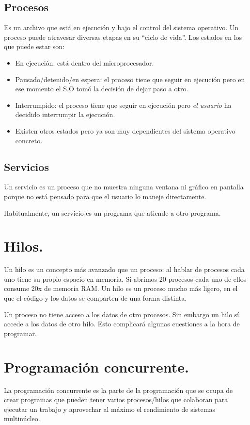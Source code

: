 \documentclass[a4paper,12pt,spanish]{sphinxmanual}
\begin{document}
\subsection{Procesos}
\label{textos/tema1:procesos}
Es un archivo que está en ejecución y bajo el control del sistema operativo. Un proceso puede atravesar diversas etapas en su ``ciclo de vida''. Los estados en los que puede estar son:
\begin{itemize}
\item {} 
En ejecución: está dentro del microprocesador.

\item {} 
Pausado/detenido/en espera: el proceso tiene que seguir en ejecución pero en ese momento el S.O tomó la decisión de dejar paso a otro.

\item {} 
Interrumpido: el proceso tiene que seguir en ejecución pero \emph{el usuario} ha decidido interrumpir la ejecución.

\item {} 
Existen otros estados pero ya son muy dependientes del sistema operativo concreto.

\end{itemize}


\subsection{Servicios}
\label{textos/tema1:servicios}
Un servicio es un proceso que no muestra ninguna ventana ni gráfico en pantalla porque no está pensado para que el usuario lo maneje directamente.

Habitualmente, un servicio es un programa que atiende a otro programa.


\section{Hilos.}
\label{textos/tema1:hilos}
Un hilo es un concepto más avanzado que un proceso: al hablar de procesos cada uno tiene su propio espacio en memoria. Si abrimos 20 procesos cada uno de ellos consume 20x de memoria RAM. Un hilo es un proceso mucho más ligero, en el que el código y los datos se comparten de una forma distinta.

Un proceso no tiene acceso a los datos de otro procesos. Sin embargo un hilo sí accede a los datos de otro hilo. Esto complicará algunas cuestiones a la hora de programar.


\section{Programación concurrente.}
\label{textos/tema1:programacion-concurrente}
La programación concurrente es la parte de la programación que se ocupa de crear programas que pueden tener varios procesos/hilos que colaboran para ejecutar un trabajo y aprovechar al máximo el rendimiento de sistemas multinúcleo.
\end{document}
